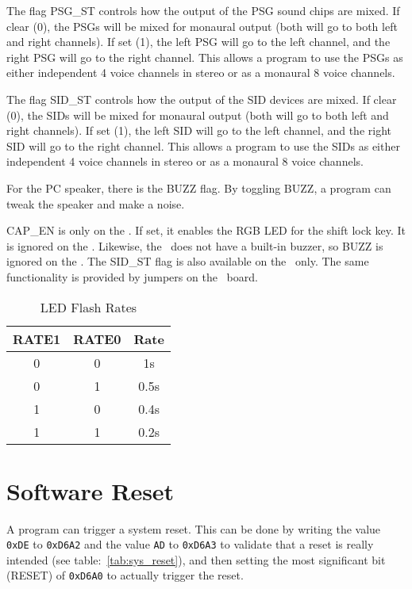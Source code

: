 The flag PSG\_ST controls how the output of the PSG sound chips are mixed. If clear (0), the PSGs will be mixed for monaural output (both will go to both left and right channels). If set (1), the left PSG will go to the left channel, and the right PSG will go to the right channel. This allows a program to use the PSGs as either independent 4 voice channels in stereo or as a monaural 8 voice channels.

The flag SID\_ST controls how the output of the SID devices are mixed. If clear (0), the SIDs will be mixed for monaural output (both will go to both left and right channels). If set (1), the left SID will go to the left channel, and the right SID will go to the right channel. This allows a program to use the SIDs as either independent 4 voice channels in stereo or as a monaural 8 voice channels.

For the PC speaker, there is the BUZZ flag. By toggling BUZZ, a program can tweak the speaker and make a noise.

\begin{note}
    CAP\_EN is only on the \fk. If set, it enables the RGB LED for the shift lock key. It is ignored on the \jr.
    Likewise, the \fk\ does not have a built-in buzzer, so BUZZ is ignored on the \fk. The SID\_ST flag is also available on the \fk\ only. The same functionality is provided by jumpers on the \fjr\ board.
\end{note}

\begin{table}[ht]
    \begin{center}
        \begin{tabular}{|c|c|c|} \hline
            RATE1 & RATE0 & Rate \\\hline\hline
            0 & 0 & 1s \\ \hline
            0 & 1 & 0.5s \\ \hline
            1 & 0 & 0.4s \\ \hline
            1 & 1 & 0.2s \\ \hline
        \end{tabular}
    \end{center}
    \caption{LED Flash Rates}
    \label{tab:led_rates}
\end{table}

\section*{Software Reset}

A program can trigger a system reset. This can be done by writing the value \verb+0xDE+ to \verb+0xD6A2+ and the value \verb+AD+ to \verb+0xD6A3+ to validate that a reset is really intended (see table:~\ref{tab:sys_reset}), and then setting the most significant bit (RESET) of \verb+0xD6A0+ to actually trigger the reset.

